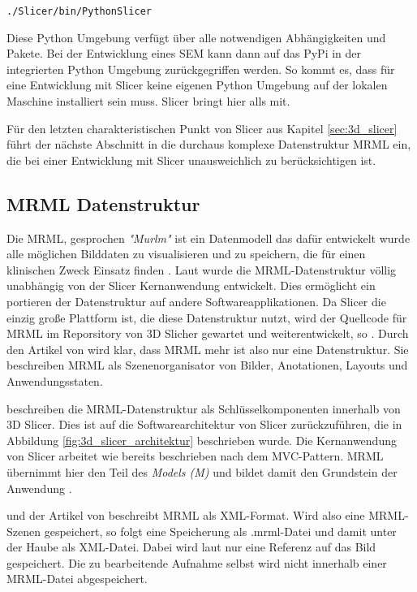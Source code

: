 \begin{center}
	\texttt{./Slicer/bin/PythonSlicer}
\end{center}

Diese Python Umgebung verfügt über alle notwendigen Abhängigkeiten und Pakete.
Bei der Entwicklung eines \ac{SEM} kann dann auf das \ac{PyPi} in der
integrierten Python Umgebung zurückgegriffen werden. So kommt es, dass für eine
Entwicklung mit Slicer keine eigenen Python Umgebung auf der lokalen Maschine
installiert sein muss. Slicer bringt hier alls mit.

Für den letzten charakteristischen Punkt von Slicer aus Kapitel \ref{sec:3d_slicer}
führt der nächste Abschnitt in die durchaus komplexe Datenstruktur \ac{MRML} ein,
die bei einer Entwicklung mit Slicer unausweichlich zu berücksichtigen ist.

\subsection{MRML Datenstruktur}
\label{subsec:mrml_datenstruktur} Die \ac{MRML}, gesprochen \textit{"Murlm"} ist
ein Datenmodell das dafür entwickelt wurde alle möglichen Bilddaten zu
visualisieren und zu speichern, die für einen klinischen Zweck Einsatz finden \citep[vgl.][]{slicer2024}.
Laut \citet{slicer2024} wurde die \ac{MRML}-Datenstruktur völlig unabhängig von der
Slicer Kernanwendung entwickelt. Dies ermöglicht ein portieren der Datenstruktur
auf andere Softwareapplikationen. Da Slicer die einzig große Plattform ist, die
diese Datenstruktur nutzt, wird der Quellcode für \ac{MRML} im Reporsitory von
3D Slicher gewartet und weiterentwickelt, so \citet{slicer2024}. Durch den Artikel
von \citet[S.1]{fedorov2012slicer} wird klar, dass \ac{MRML} mehr ist also nur
eine Datenstruktur. Sie beschreiben \ac{MRML} als Szenenorganisator von Bilder, Anotationen,
Layouts und Anwendungsstaten.

\citet[S.~11]{fedorov2012slicer} beschreiben die \ac{MRML}-Datenstruktur als
Schlüsselkomponenten innerhalb von 3D Slicer. Dies ist auf die Softwarearchitektur
von Slicer zurückzuführen, die in Abbildung \ref{fig:3d_slicer_architektur}
beschrieben wurde. Die Kernanwendung von Slicer arbeitet wie bereits beschrieben
nach dem \ac{MVC}-Pattern. \ac{MRML} übernimmt hier den Teil des \textit{Models
(M)} und bildet damit den Grundstein der Anwendung \citep[vgl.][S.~25]{fedorov2012slicer}.

\citet{slicer2024} und der Artikel von \citet[S.~11]{fedorov2012slicer}
beschreibt \ac{MRML} als \ac{XML}-Format. Wird also eine \ac{MRML}-Szenen
gespeichert, so folgt eine Speicherung als .mrml-Datei und damit unter der Haube
als XML-Datei. Dabei wird laut \citet{slicer2024} nur eine Referenz auf das Bild
gespeichert. Die zu bearbeitende Aufnahme selbst wird nicht innerhalb einer \ac{MRML}-Datei
abgespeichert.

